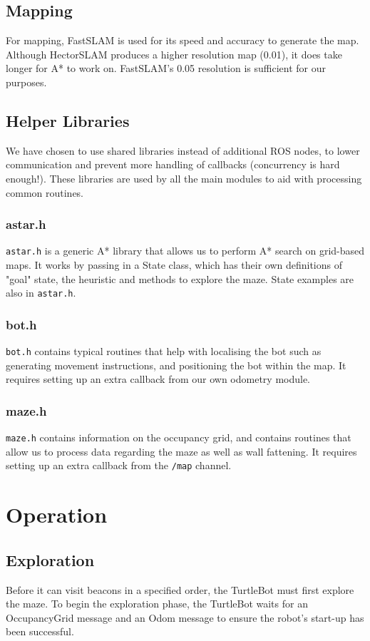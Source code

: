 \documentclass[titlepage,12pt,a4paper]{article}
\begin{document}
\subsection{Mapping}
For mapping, FastSLAM is used for its speed and accuracy to generate the map. Although HectorSLAM produces a higher resolution map (0.01), it does take longer for A* to work on. FastSLAM's 0.05 resolution is sufficient for our purposes.

\subsection{Helper Libraries}
We have chosen to use shared libraries instead of additional ROS nodes, to lower communication and prevent more handling of callbacks (concurrency is hard enough!). These libraries are used by all the main modules to aid with processing common routines.

\subsubsection{astar.h}
\verb|astar.h| is a generic A* library that allows us to perform A* search on grid-based maps. It works by passing in a State class, which has their own definitions of "goal" state, the heuristic and methods to explore the maze. State examples are also in \verb|astar.h|.

\subsubsection{bot.h}
\verb|bot.h| contains typical routines that help with localising the bot such as generating movement instructions, and positioning the bot within the map. It requires setting up an extra callback from our own odometry module.

\subsubsection{maze.h}
\verb|maze.h| contains information on the occupancy grid, and contains routines that allow us to process data regarding the maze as well as wall fattening. It requires setting up an extra callback from the \verb|/map| channel.

\pagebreak
\section{Operation}
\subsection{Exploration}
Before it can visit beacons in a specified order, the TurtleBot must first explore the maze. To begin the exploration phase, the TurtleBot waits for an OccupancyGrid message and an Odom message to ensure the robot's start-up has been successful. 
\end{document}
